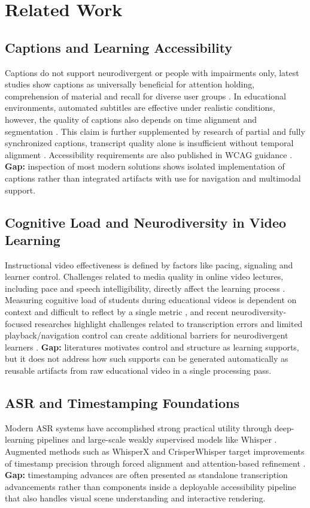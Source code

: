 ﻿\documentclass[conference]{IEEEtran}
\begin{document}
\section{Related Work}
\subsection{Captions and Learning Accessibility}
Captions do not support neurodivergent or people with impairments only, latest studies show captions as universally beneficial for attention holding, comprehension of material and recall for diverse user groups \cite{Gernsbacher2015}. In educational environments, automated subtitles are effective under realistic conditions, however, the quality of captions also depends on time alignment and segmentation \cite{Malakul2023}. This claim is further supplemented by research of partial and fully synchronized captions, transcript quality alone is insufficient without temporal alignment \cite{Mirzaei2018}. Accessibility requirements are also published in WCAG guidance \cite{WCAG21}. \textbf{Gap:} inspection of most modern solutions shows isolated implementation of captions rather than integrated artifacts with use for navigation and multimodal support.

\subsection{Cognitive Load and Neurodiversity in Video Learning}
Instructional video effectiveness is defined by factors like pacing, signaling and learner control. Challenges related to media quality in online video lectures, including pace and speech intelligibility, directly affect the learning process \cite{Lange2020}. Measuring cognitive load of students during educational videos is dependent on context and difficult to reflect by a single metric \cite{Kruger2016},  and recent neurodiversity-focused researches highlight challenges related to transcription errors and limited playback/navigation control can create additional barriers for neurodivergent learners \cite{LeCunff2024,Horlin2024}. \textbf{Gap:} literatures motivates control and structure as learning supports, but it does not address how such supports can be generated automatically as reusable artifacts from raw educational video in a single processing pass.

\subsection{ASR and Timestamping Foundations}
Modern ASR systems have accomplished strong practical utility through deep-learning pipelines \cite{Malik2020} and large-scale weakly supervised models like Whisper \cite{Radford2022}. Augmented methods such as WhisperX and CrisperWhisper target improvements of timestamp precision through forced alignment and attention-based refinement \cite{Bain2023,Wagner2024}. \textbf{Gap:} timestamping advances are often presented as standalone transcription advancements rather than components inside a deployable accessibility pipeline that also handles visual scene understanding and interactive rendering.
\end{document}

